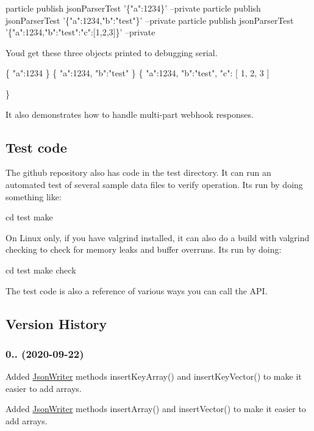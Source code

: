 \begin{DoxyCode}
particle publish jsonParserTest '\{"a":1234\}' --private
particle publish jsonParserTest '\{"a":1234,"b":"test"\}' --private
particle publish jsonParserTest '\{"a":1234,"b":"test":"c":[1,2,3]\}' --private
\end{DoxyCode}


You\textquotesingle{}d get these three objects printed to debugging serial.


\begin{DoxyCode}
\{
  "a":1234
\}
\{
  "a":1234,
  "b":"test"
\}
\{
  "a":1234,
  "b":"test",
  "c":  [
    1,
    2,
    3
  ]

\}
\end{DoxyCode}


It also demonstrates how to handle multi-\/part webhook responses.

\subsection*{Test code}

The github repository also has code in the test directory. It can run an automated test of several sample data files to verify operation. It\textquotesingle{}s run by doing something like\+:


\begin{DoxyCode}
cd test
make
\end{DoxyCode}


On Linux only, if you have valgrind installed, it can also do a build with valgrind checking to check for memory leaks and buffer overruns. It\textquotesingle{}s run by doing\+:


\begin{DoxyCode}
cd test
make check
\end{DoxyCode}


The test code is also a reference of various ways you can call the A\+PI.

\subsection*{Version History}

\subsubsection*{0.. (2020-\/09-\/22)}


\begin{DoxyItemize}
\item Added \hyperlink{class_json_writer}{Json\+Writer} methods insert\+Key\+Array() and insert\+Key\+Vector() to make it easier to add arrays.
\item Added \hyperlink{class_json_writer}{Json\+Writer} methods insert\+Array() and insert\+Vector() to make it easier to add arrays.
\end{DoxyItemize}

